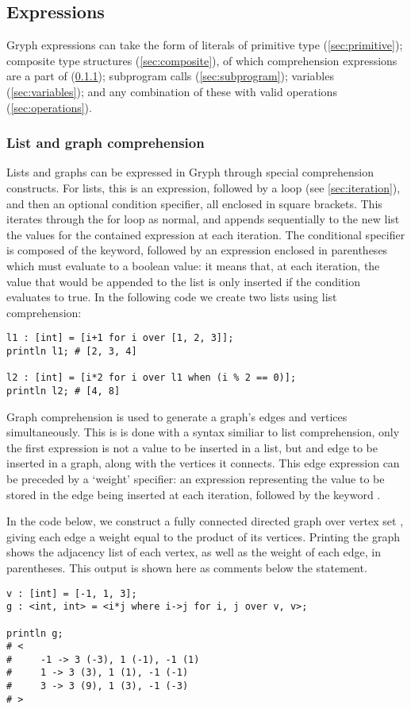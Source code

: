 \subsection{Expressions}
\label{sec:expressions}
Gryph expressions can take the form of literals of primitive type (\ref{sec:primitive}); composite type structures (\ref{sec:composite}), of which comprehension expressions are a part of (\ref{sec:comprehension}); subprogram calls (\ref{sec:subprogram}); variables (\ref{sec:variables}); and any combination of these with valid operations (\ref{sec:operations}).

\subsubsection{List and graph comprehension}
\label{sec:comprehension}
Lists and graphs can be expressed in Gryph through special comprehension constructs. For lists, this is an expression, followed by a  loop (see \ref{sec:iteration}), and then an optional condition specifier, all enclosed in square brackets. This iterates through the for loop as normal, and appends sequentially to the new list the values for the contained expression at each iteration. The conditional specifier is composed of the  keyword, followed by an expression enclosed in parentheses which must evaluate to a boolean value: it means that, at each iteration, the value that would be appended to the list is only inserted if the condition evaluates to true.
In the following code we create two lists using list comprehension:
\begin{lstlisting}[language=Gryph]
l1 : [int] = [i+1 for i over [1, 2, 3]];
println l1; # [2, 3, 4]

l2 : [int] = [i*2 for i over l1 when (i % 2 == 0)];
println l2; # [4, 8]
\end{lstlisting}

Graph comprehension is used to generate a graph's edges and vertices simultaneously. This is is done with a syntax similiar to list comprehension, only the first expression is not a value to be inserted in a list, but and edge to be inserted in a graph, along with the vertices it connects. This edge expression can be preceded by a `weight' specifier: an expression representing the value to be stored in the edge being inserted at each iteration, followed by the keyword .

In the code below, we construct a fully connected directed graph over vertex set , giving each edge a weight equal to the product of its vertices. Printing the graph shows the adjacency list of each vertex, as well as the weight of each edge, in parentheses. This output is shown here as comments below the  statement.
\begin{lstlisting}[language=Gryph]
v : [int] = [-1, 1, 3];
g : <int, int> = <i*j where i->j for i, j over v, v>;

println g;
# <
#     -1 -> 3 (-3), 1 (-1), -1 (1)
#     1 -> 3 (3), 1 (1), -1 (-1)
#     3 -> 3 (9), 1 (3), -1 (-3)
# >
\end{lstlisting}

